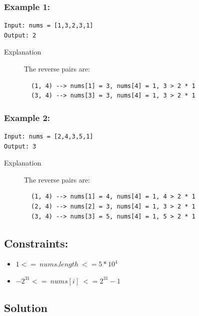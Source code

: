 \documentclass[11pt]{article}
\begin{document}
\subsubsection{Example 1:}
\label{sec:orgc611f2b}
\begin{verbatim}
Input: nums = [1,3,2,3,1]
Output: 2
\end{verbatim}
\begin{description}
\item[{Explanation}] The reverse pairs are:
\begin{verbatim}
  (1, 4) --> nums[1] = 3, nums[4] = 1, 3 > 2 * 1
  (3, 4) --> nums[3] = 3, nums[4] = 1, 3 > 2 * 1
\end{verbatim}
\end{description}

\subsubsection{Example 2:}
\label{sec:org6b00e93}
\begin{verbatim}
Input: nums = [2,4,3,5,1]
Output: 3
\end{verbatim}
\begin{description}
\item[{Explanation}] The reverse pairs are:
\begin{verbatim}
  (1, 4) --> nums[1] = 4, nums[4] = 1, 4 > 2 * 1
  (2, 4) --> nums[2] = 3, nums[4] = 1, 3 > 2 * 1
  (3, 4) --> nums[3] = 5, nums[4] = 1, 5 > 2 * 1
\end{verbatim}
\end{description}

\subsection{Constraints:}
\label{sec:org07ea4d3}
\begin{itemize}
\item \(1 <= ~nums.length~ <= 5 * 10^4\)
\item \(-2^{31} <= ~nums[i]~ <= 2^{31} - 1\)
\end{itemize}

\subsection{Solution}
\label{sec:org6c5fd73}
\end{document}
